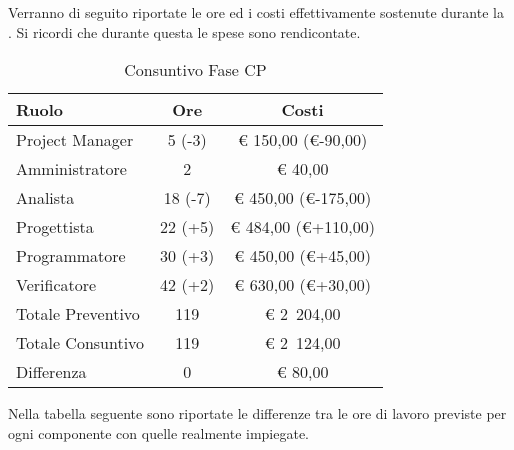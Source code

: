 			Verranno di seguito riportate le ore ed i costi effettivamente sostenute durante la . Si ricordi che durante questa  le spese sono rendicontate.
			\begin{table}[H]
				\begin{center}
					\begin{tabular}{| l | c | c |}
						\hline
						Ruolo 				& Ore 		& Costi  \\ \hline
						
						Project Manager		& 5 (-3)	& \euro{} 150,00 (\euro{}-90,00)	\\
						Amministratore 		& 2 		& \euro{} 40,00 	\\
						Analista			& 18 (-7)	& \euro{} 450,00 (\euro{}-175,00)	\\
						Progettista 		& 22 (+5)	& \euro{} 484,00 (\euro{}+110,00) 	\\
						Programmatore		& 30 (+3)	& \euro{} 450,00 (\euro{}+45,00)	\\
						Verificatore		& 42 (+2)	& \euro{} 630,00 (\euro{}+30,00)	\\ \hline \hline
						
						Totale Preventivo	& 119 		& \euro{} 2~204,00 	\\ \hline
						Totale Consuntivo	& 119 		& \euro{} 2~124,00  \\ \hline
						Differenza			& 0 		& \euro{} 80,00 	\\ \hline
					\end{tabular}
				\end{center}
				\caption{Consuntivo Fase CP}
			\end{table}


			Nella tabella seguente sono riportate le differenze tra le ore di lavoro previste per ogni componente con quelle realmente impiegate.

